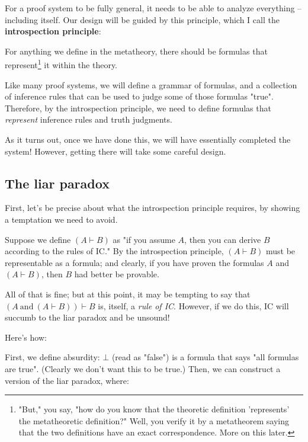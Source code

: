 \documentclass{article}
\begin{document}
  For a proof system to be fully general, it needs to be able to analyze everything – including itself. Our design will be guided by this principle, which I call the \textbf{introspection principle}:
  
  \begin{center}
    For anything we define in the metatheory, there should be formulas that represent\footnote{"But," you say, "how do you know that the theoretic definition 'represents' the metatheoretic definition?" Well, you verify it by a metatheorem saying that the two definitions have an exact correspondence. More on this later.} it within the theory.
  \end{center}
  
  Like many proof systems, we will define a grammar of formulas, and a collection of inference rules that can be used to judge some of those formulas "true". Therefore, by the introspection principle, we need to define formulas that \emph{represent} inference rules and truth judgments.
  
  As it turns out, once we have done this, we will have essentially completed the system! However, getting there will take some careful design.
  
  \subsection{The liar paradox}
  
  First, let's be precise about what the introspection principle requires, by showing a temptation we need to avoid.
  
  Suppose we define $(A \vdash B)$ as "if you assume $A$, then you can derive $B$ according to the rules of IC." By the introspection principle, $(A \vdash B)$ must be representable as a formula; and clearly, if you have proven the formulas $A$ and $(A \vdash B)$, then $B$ had better be provable.
  
  \newcommand{\strongmp}{(A\ \mathrm{and}\ (A \vdash B)) \vdash B}
  All of that is fine; but at this point, it may be tempting to say that $\strongmp$ is, itself, a \emph{rule of IC}. However, if we do this, IC will succumb to the liar paradox and be unsound!
  
  Here's how:
  
  First, we define absurdity: $\bot$ (read as "false") is a formula that says "all formulas are true".
  (Clearly we don't want this to be true.)
  Then, we can construct a version of the liar paradox, where:
  
\end{document}

